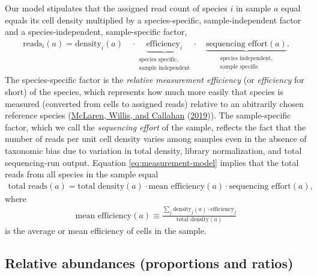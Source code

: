 \documentclass[
]{article}
\theoremstyle{definition}
\theoremstyle{definition}
\theoremstyle{definition}
\theoremstyle{definition}
\theoremstyle{remark}
\begin{document}
Our model stipulates that the assigned read count of species \(i\) in sample \(a\) equal equals its cell density multiplied by a species-specific, sample-independent factor and a species-independent, sample-specific factor,
\begin{align}
  \label{eq:measurement-model}
  \text{reads}_{i}(a)
  = \text{density}_{i}(a) \quad \cdot
    \underbrace{\text{efficiency}_{i}}_{\substack{\text{species specific,} \\  \text{sample independent}}}
    \cdot \quad
    \underbrace{\text{sequencing effort}(a)}_{\substack{\text{species independent,} \\  \text{sample specific}}}.
\end{align}
The species-specific factor is the \emph{relative measurement efficiency} (or \emph{efficiency} for short) of the species, which represents how much more easily that species is measured (converted from cells to assigned reads) relative to an abitrarily chosen reference species (\protect\hyperlink{ref-mclaren2019cons}{McLaren, Willis, and Callahan} (\protect\hyperlink{ref-mclaren2019cons}{2019})).
The sample-specific factor, which we call the \emph{sequencing effort} of the sample, reflects the fact that the number of reads per unit cell density varies among samples even in the absence of taxonomic bias due to variation in total density, library normalization, and total sequencing-run output.
Equation \eqref{eq:measurement-model} implies that the total reads from all species in the sample equal
\begin{align}
  \label{eq:total-reads}
  \text{total reads}(a)
    = \text{total density}(a) \cdot \text{mean efficiency}(a) \cdot \text{sequencing effort}(a),
\end{align}
where
\begin{align}
  \label{eq:mean-efficiency}
  \text{mean efficiency}(a) 
  \equiv \frac{\sum_{j}\text{density}_j(a)\cdot \text{efficiency}_j}{\text{total density}(a)}
\end{align}
is the average or mean efficiency of cells in the sample.

\hypertarget{relative-abundances-proportions-and-ratios}{%
\subsection{Relative abundances (proportions and ratios)}\label{relative-abundances-proportions-and-ratios}}
\end{document}
